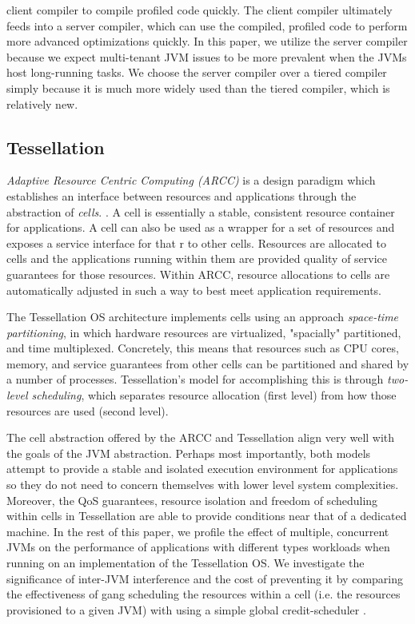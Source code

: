 \documentclass{sig-alternate}
\begin{document}
 client compiler to compile profiled code quickly. The client compiler ultimately feeds into a server compiler, which can use the compiled, profiled code to perform more advanced optimizations quickly. In this paper, we utilize the server compiler because we expect multi-tenant JVM issues to be more prevalent when the JVMs host long-running tasks. We choose the server compiler over a tiered compiler simply because it is much more widely used than the tiered compiler, which is relatively new.

\subsection{Tessellation}

\textit{Adaptive Resource Centric Computing (ARCC)} is a design paradigm which establishes an interface between resources and applications through the abstraction of \textit{cells}.  \cite{colmenares2013tessellation}. A cell is essentially a stable, consistent resource container for applications. A cell can also be used as a wrapper for a set of resources and exposes a service interface for that r to other cells. Resources are allocated to cells and the applications running within them are provided quality of service guarantees for those resources. Within ARCC, resource allocations to cells are automatically adjusted in such a way to best meet application requirements.

The Tessellation OS architecture \cite{colmenares2010resource, colmenares2013tessellation, liu2009tessellation} implements cells using an approach \textit{space-time partitioning}, in which hardware resources are virtualized, "spacially" partitioned, and time multiplexed. Concretely, this means that resources such as CPU cores, memory, and service guarantees from other cells can be partitioned and shared by a number of processes. Tessellation's model for accomplishing this is through \textit{two-level scheduling}, which separates resource allocation (first level) from how those resources are used (second level).

The cell abstraction offered by the ARCC and Tessellation align very well with the goals of the JVM abstraction. Perhaps most importantly, both models attempt to provide a stable and isolated execution environment for applications so they do not need to concern themselves with lower level system complexities. Moreover, the QoS guarantees, resource isolation and freedom of scheduling within cells in Tessellation are able to provide conditions near that of a dedicated machine. In the rest of this paper, we profile the effect of multiple, concurrent JVMs on the performance of applications with different types workloads when running on an implementation of the Tessellation OS. We investigate the significance of inter-JVM interference and the cost of preventing it by comparing the effectiveness of gang scheduling the resources within a cell (i.e. the resources provisioned to a given JVM) with using a simple global credit-scheduler \cite{ackaouy2006xen}.
\end{document}
